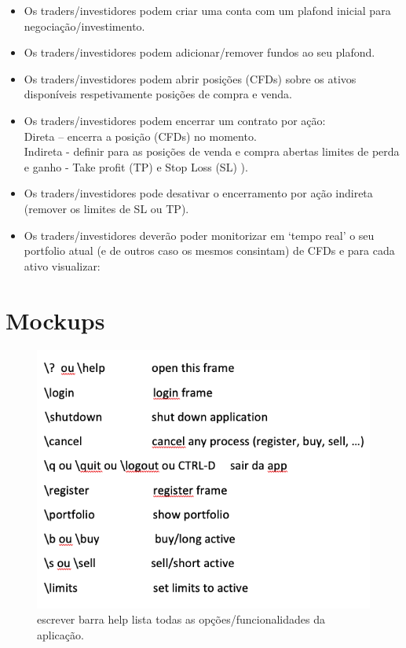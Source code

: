 \documentclass[11pt,a4paper]{report}%
\begin{document}
\begin{itemize}
    \item Os traders/investidores podem criar uma conta com um plafond inicial para negociação/investimento.
    \item Os traders/investidores podem adicionar/remover fundos ao seu plafond.
    \item Os traders/investidores podem abrir posições (CFDs) sobre os ativos disponíveis respetivamente posições de compra e venda.
    \item Os traders/investidores podem encerrar um contrato por ação:\\
Direta – encerra a posição (CFDs) no momento.\\
Indireta - definir para as posições de venda e compra abertas limites de perda e ganho - Take profit (TP) e Stop Loss (SL) ).\\
    \item Os traders/investidores pode desativar o encerramento por ação indireta (remover os limites de SL ou TP).
    \item Os traders/investidores deverão poder monitorizar em ‘tempo real’ o seu portfolio atual (e de outros caso os mesmos consintam) de CFDs e para cada ativo visualizar:

\end{itemize}{}

\section{Mockups}

\begin{figure}[H]
	\centering
	\includegraphics[scale=0.6]{ui1.png}
	\caption{escrever barra help lista todas as opções/funcionalidades da aplicação.}
	\label{img:pag}
\end{figure}
\end{document}
